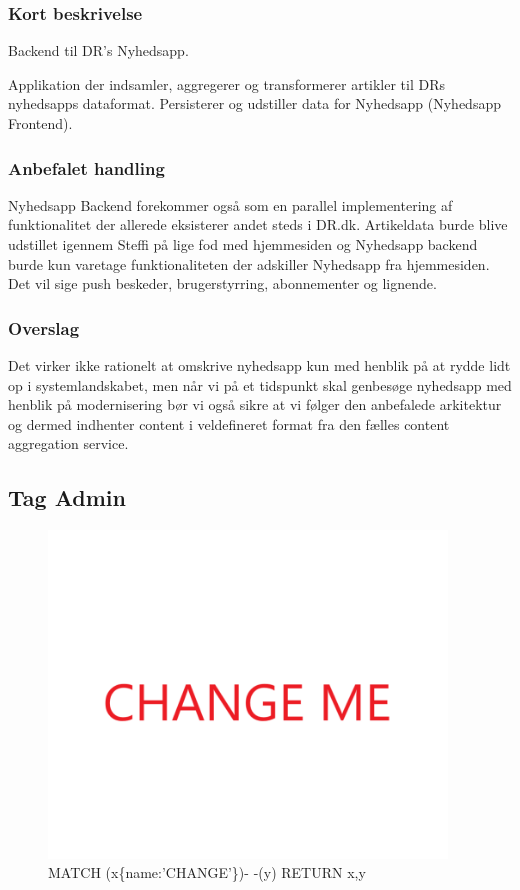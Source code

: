 \documentclass{article}
\begin{document}
\subsubsection{Kort beskrivelse}
Backend til DR's Nyhedsapp.	

Applikation der indsamler, aggregerer og transformerer artikler til DRs nyhedsapps dataformat. Persisterer og udstiller data for Nyhedsapp (Nyhedsapp Frontend).
\subsubsection{Anbefalet handling}
Nyhedsapp Backend forekommer også som en parallel implementering af funktionalitet der allerede eksisterer andet steds i DR.dk. 
Artikeldata burde blive udstillet igennem Steffi på lige fod med hjemmesiden og Nyhedsapp backend burde kun varetage funktionaliteten der adskiller Nyhedsapp fra hjemmesiden. Det vil sige push beskeder, brugerstyrring, abonnementer og lignende. 
\subsubsection{Overslag}
Det virker ikke rationelt at omskrive nyhedsapp kun med henblik på at rydde lidt op i systemlandskabet, men når vi på et tidspunkt skal genbesøge nyhedsapp med henblik på modernisering bør vi også sikre at vi følger den anbefalede arkitektur og dermed indhenter content i veldefineret format fra den fælles content aggregation service.

\subsection{Tag Admin}
\begin{figure}[h]
\includegraphics[width=300pt]{CHANGE.PNG}
\caption{MATCH (x\{name:'CHANGE'\})- -(y) RETURN x,y}
\end{figure}
\end{document}

